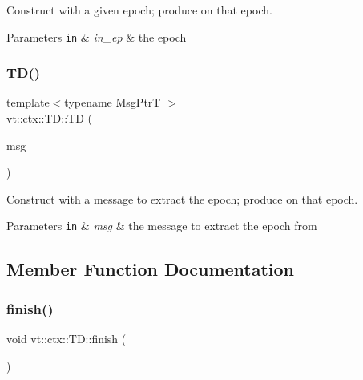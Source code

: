Construct with a given epoch; produce on that epoch. 


\begin{DoxyParams}[1]{Parameters}
\mbox{\tt in}  & {\em in\+\_\+ep} & the epoch \\
\hline
\end{DoxyParams}
\mbox{\label{structvt_1_1ctx_1_1_t_d_a632c366417b95a168c345cfb17051eeb}} 
\subsubsection{\texorpdfstring{T\+D()}{TD()}\hspace{0.1cm}{\footnotesize\ttfamily [3/3]}}
{\footnotesize\ttfamily template$<$typename Msg\+PtrT $>$ \\
vt\+::ctx\+::\+T\+D\+::\+TD (\begin{DoxyParamCaption}\item[{Msg\+PtrT const \&}]{msg }\end{DoxyParamCaption})\hspace{0.3cm}{\ttfamily [explicit]}}



Construct with a message to extract the epoch; produce on that epoch. 


\begin{DoxyParams}[1]{Parameters}
\mbox{\tt in}  & {\em msg} & the message to extract the epoch from \\
\hline
\end{DoxyParams}


\subsection{Member Function Documentation}
\mbox{\label{structvt_1_1ctx_1_1_t_d_a4c103ae125725848ad7af51e6c88144e}} 
\subsubsection{\texorpdfstring{finish()}{finish()}}
{\footnotesize\ttfamily void vt\+::ctx\+::\+T\+D\+::finish (\begin{DoxyParamCaption}{ }\end{DoxyParamCaption})}



